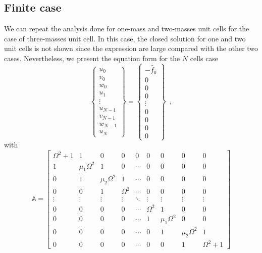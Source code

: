\documentclass[11pt]{article}
\begin{document}
\subsection{Finite case}
We can repeat the analysis done for one-mass and two-masses unit cells for the case of three-masses unit cell. In this case, the closed solution for one and two unit cells is not shown since the expression are large compared with the other two cases. Nevertheless, we present the equation form for the $N$ cells case
\begin{equation}
  [\mathbb{A} - 2\mathbb{I}]\begin{Bmatrix}
  u_0 \\ 
  v_0 \\ 
  w_0 \\ 
  u_1 \\ 
  \vdots \\ 
  u_{N-1} \\ 
  v_{N-1} \\ 
  w_{N-1} \\ 
  u_N
  \end{Bmatrix} = 
  \begin{Bmatrix}
  -\hat{f}_0 \\ 
  0 \\ 
  0 \\ 
  0 \\ 
  \vdots \\ 
  0 \\ 
  0 \\ 
  0 \\ 
  0
\end{Bmatrix} \enspace ,
\end{equation}
with
\[\mathbb{A} = \begin{bmatrix}
 \Omega^2 + 1 & 1 & 0 & 0 & 0 & 0 & 0 & 0 & 0 \\ 
 1 & \mu_1\Omega^2 & 1 & 0 & \cdots & 0 & 0 & 0 & 0 \\ 
 0 & 1 & \mu_2\Omega^2 & 1 & \cdots & 0 & 0 & 0 & 0 \\ 
 0 & 0 & 1 & \Omega^2 & \cdots & 0 & 0 & 0 & 0 \\ 
 \vdots & \vdots & \vdots & \vdots & \ddots & \vdots & \vdots & \vdots & \vdots \\ 
 0 & 0 & 0 & 0 & \cdots & \Omega^2 & 1 & 0 & 0 \\ 
 0 & 0 & 0 & 0 & \cdots & 1 & \mu_1\Omega^2 & 0 & 0 \\ 
 0 & 0 & 0 & 0 & \cdots & 0 & 1 & \mu_2\Omega^2 & 1 \\ 
 0 & 0 & 0 & 0 & \cdots & 0 & 0 & 1 & \Omega^2 + 1
 \end{bmatrix}\]
 
\end{document}
